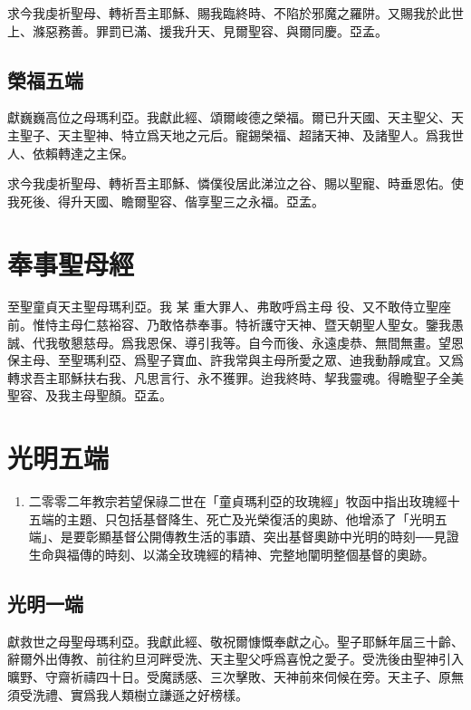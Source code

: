 求{\cspace}今我虔祈聖母、轉祈吾主耶穌、賜我臨終時、不陷於邪魔之羅阱。又賜我於此世上、滌惡務善。罪罰已滿、援我升天、見爾聖容、與爾同慶。{\cspace}亞孟。

\subsection{榮福五端}
獻{\cspace}巍巍高位之母瑪利亞。我獻此經、頌爾峻德之榮福。爾已升天國、天主聖父、天主聖子、天主聖神、特立爲天地之元后。寵錫榮福、超諸天神、及諸聖人。爲我世人、依賴轉達之主保。

求{\cspace}今我虔祈聖母、轉祈吾主耶穌、憐僕役居此涕泣之谷、賜以聖寵、時垂恩佑。使我死後、得升天國、瞻爾聖容、偕享聖三之永福。{\cspace}亞孟。

\section*{奉事聖母經}
至聖童貞天主聖母瑪利亞。我 {\small 某} 重大罪人、弗敢呼爲主母 {\small \raisebox{-0.2zh}{僕}\raisebox{0.2zh}{婢}} 役、又不敢侍立聖座前。惟恃主母仁慈裕容、乃敢恪恭奉事。特祈護守天神、暨天朝聖人聖女。鑒我愚誠、代我敬懇慈母。爲我恩保、導引我等。自今而後、永遠虔恭、無間無畫。望恩保主母、至聖瑪利亞、爲聖子寶血、許我常與主母所愛之眾、迪我動靜咸宜。又爲轉求吾主耶穌扶右我、凡思言行、永不獲罪。迨我終時、挈我靈魂。得瞻聖子全美聖容、及我主母聖顏。{\cspace}亞孟。

\section*{光明五端}
\begin{enumerate}
    \item[]{\small 二零零二年教宗若望保祿二世在「童貞瑪利亞的玫瑰經」牧函中指出玫瑰經十五端的主題、只包括基督降生、死亡及光榮復活的奧跡、他增添了「光明五端」、是要彰顯基督公開傳教生活的事蹟、突出基督奧跡中光明的時刻──見證生命與福傳的時刻、以滿全玫瑰經的精神、完整地闡明整個基督的奧跡。}
\end{enumerate}

\subsection*{光明一端}
獻{\cspace}救世之母聖母瑪利亞。我獻此經、敬祝爾慷慨奉獻之心。聖子耶穌年屆三十齡、辭爾外出傳教、前往約旦河畔受洗、天主聖父呼爲喜悅之愛子。受洗後由聖神引入曠野、守齋祈禱四十日。受魔誘感、三次擊敗、天神前來伺候在旁。天主子、原無須受洗禮、實爲我人類樹立謙遜之好榜樣。

